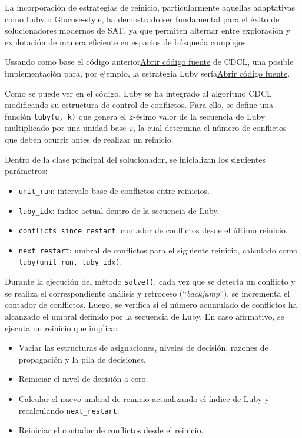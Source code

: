 La incorporación de estrategias de reinicio, particularmente aquellas adaptativas como Luby o Glucose-style, ha demostrado ser fundamental para el éxito de solucionadores modernos de SAT, ya que permiten alternar entre exploración y explotación de manera eficiente en espacios de búsqueda complejos.

Ussando como base el código anterior\href{Graphics/dpll\_cdcl\_sat\_solver.py}{Abrir c\'odigo fuente} de CDCL, una posible implementación para, por ejemplo, la estrategia Luby ser\'ia\href{Graphics/dpll\_cdcl\_luby\_sa\_solver.py}{Abrir c\'odigo fuente}.

Como se puede ver en el c\'odigo, Luby se ha integrado al algoritmo CDCL modificando su estructura de control de conflictos. Para ello, se define una funci\'on \texttt{luby(u, k)} que genera el k-\'esimo valor de la secuencia de Luby multiplicado por una unidad base \texttt{u}, la cual determina el n\'umero de conflictos que deben ocurrir antes de realizar un reinicio.

Dentro de la clase principal del solucionador, se inicializan los siguientes parámetros:

\begin{itemize}
    \item \texttt{unit\_run}: intervalo base de conflictos entre reinicios.
    \item \texttt{luby\_idx}: índice actual dentro de la secuencia de Luby.
    \item \texttt{conflicts\_since\_restart}: contador de conflictos desde el último reinicio.
    \item \texttt{next\_restart}: umbral de conflictos para el siguiente reinicio, calculado como \texttt{luby(unit\_run, luby\_idx)}.
\end{itemize}

Durante la ejecución del método \texttt{solve()}, cada vez que se detecta un conflicto y se realiza el correspondiente análisis y retroceso (“\textit{backjump}”), se incrementa el contador de conflictos. Luego, se verifica si el número acumulado de conflictos ha alcanzado el umbral definido por la secuencia de Luby. En caso afirmativo, se ejecuta un reinicio que implica:

\begin{itemize}
    \item Vaciar las estructuras de asignaciones, niveles de decisión, razones de propagación y la pila de decisiones.
    \item Reiniciar el nivel de decisión a cero.
    \item Calcular el nuevo umbral de reinicio actualizando el índice de Luby y recalculando \texttt{next\_restart}.
    \item Reiniciar el contador de conflictos desde el reinicio.
\end{itemize}

